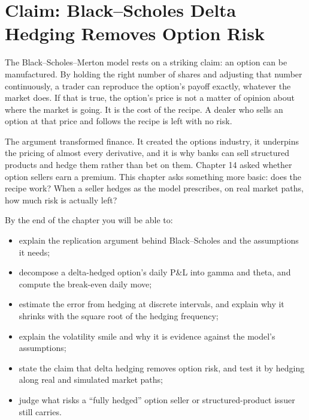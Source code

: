 \makeatletter
{}
\makeatother

\chapter{Claim: Black--Scholes Delta Hedging Removes Option Risk}
\label{ch:15}

The Black--Scholes--Merton model rests on a striking claim: an option can be manufactured. By holding the right number of shares and adjusting that number continuously, a trader can reproduce the option's payoff exactly, whatever the market does. If that is true, the option's price is not a matter of opinion about where the market is going. It is the cost of the recipe. A dealer who sells an option at that price and follows the recipe is left with no risk.

The argument transformed finance. It created the options industry, it underpins the pricing of almost every derivative, and it is why banks can sell structured products and hedge them rather than bet on them. Chapter 14 asked whether option sellers earn a premium. This chapter asks something more basic: does the recipe work? When a seller hedges as the model prescribes, on real market paths, how much risk is actually left?

By the end of the chapter you will be able to:

\begin{itemize}
  \item explain the replication argument behind Black--Scholes and the assumptions it needs;
  \item decompose a delta-hedged option's daily P\&L into gamma and theta, and compute the break-even daily move;
  \item estimate the error from hedging at discrete intervals, and explain why it shrinks with the square root of the hedging frequency;
  \item explain the volatility smile and why it is evidence against the model's assumptions;
  \item state the claim that delta hedging removes option risk, and test it by hedging along real and simulated market paths;
  \item judge what risks a ``fully hedged'' option seller or structured-product issuer still carries.
\end{itemize}

